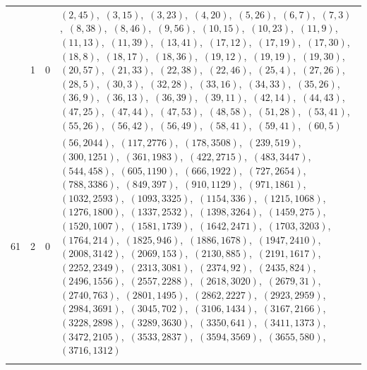\documentclass[11pt]{article}
\begin{document}
\begin{longtable}{@{}rrl>{\raggedright\arraybackslash}p{}@{}}
\addlinespace[3pt]
61 & 1 & $0$ & $(2,45)$,\allowbreak\ $(3,15)$,\allowbreak\ $(3,23)$,\allowbreak\ $(4,20)$,\allowbreak\ $(5,26)$,\allowbreak\ $(6,7)$,\allowbreak\ $(7,3)$,\allowbreak\ $(8,38)$,\allowbreak\ $(8,46)$,\allowbreak\ $(9,56)$,\allowbreak\ $(10,15)$,\allowbreak\ $(10,23)$,\allowbreak\ $(11,9)$,\allowbreak\ $(11,13)$,\allowbreak\ $(11,39)$,\allowbreak\ $(13,41)$,\allowbreak\ $(17,12)$,\allowbreak\ $(17,19)$,\allowbreak\ $(17,30)$,\allowbreak\ $(18,8)$,\allowbreak\ $(18,17)$,\allowbreak\ $(18,36)$,\allowbreak\ $(19,12)$,\allowbreak\ $(19,19)$,\allowbreak\ $(19,30)$,\allowbreak\ $(20,57)$,\allowbreak\ $(21,33)$,\allowbreak\ $(22,38)$,\allowbreak\ $(22,46)$,\allowbreak\ $(25,4)$,\allowbreak\ $(27,26)$,\allowbreak\ $(28,5)$,\allowbreak\ $(30,3)$,\allowbreak\ $(32,28)$,\allowbreak\ $(33,16)$,\allowbreak\ $(34,33)$,\allowbreak\ $(35,26)$,\allowbreak\ $(36,9)$,\allowbreak\ $(36,13)$,\allowbreak\ $(36,39)$,\allowbreak\ $(39,11)$,\allowbreak\ $(42,14)$,\allowbreak\ $(44,43)$,\allowbreak\ $(47,25)$,\allowbreak\ $(47,44)$,\allowbreak\ $(47,53)$,\allowbreak\ $(48,58)$,\allowbreak\ $(51,28)$,\allowbreak\ $(53,41)$,\allowbreak\ $(55,26)$,\allowbreak\ $(56,42)$,\allowbreak\ $(56,49)$,\allowbreak\ $(58,41)$,\allowbreak\ $(59,41)$,\allowbreak\ $(60,5)$\\
61 & 2 & $0$ & $(56,2044)$,\allowbreak\ $(117,2776)$,\allowbreak\ $(178,3508)$,\allowbreak\ $(239,519)$,\allowbreak\ $(300,1251)$,\allowbreak\ $(361,1983)$,\allowbreak\ $(422,2715)$,\allowbreak\ $(483,3447)$,\allowbreak\ $(544,458)$,\allowbreak\ $(605,1190)$,\allowbreak\ $(666,1922)$,\allowbreak\ $(727,2654)$,\allowbreak\ $(788,3386)$,\allowbreak\ $(849,397)$,\allowbreak\ $(910,1129)$,\allowbreak\ $(971,1861)$,\allowbreak\ $(1032,2593)$,\allowbreak\ $(1093,3325)$,\allowbreak\ $(1154,336)$,\allowbreak\ $(1215,1068)$,\allowbreak\ $(1276,1800)$,\allowbreak\ $(1337,2532)$,\allowbreak\ $(1398,3264)$,\allowbreak\ $(1459,275)$,\allowbreak\ $(1520,1007)$,\allowbreak\ $(1581,1739)$,\allowbreak\ $(1642,2471)$,\allowbreak\ $(1703,3203)$,\allowbreak\ $(1764,214)$,\allowbreak\ $(1825,946)$,\allowbreak\ $(1886,1678)$,\allowbreak\ $(1947,2410)$,\allowbreak\ $(2008,3142)$,\allowbreak\ $(2069,153)$,\allowbreak\ $(2130,885)$,\allowbreak\ $(2191,1617)$,\allowbreak\ $(2252,2349)$,\allowbreak\ $(2313,3081)$,\allowbreak\ $(2374,92)$,\allowbreak\ $(2435,824)$,\allowbreak\ $(2496,1556)$,\allowbreak\ $(2557,2288)$,\allowbreak\ $(2618,3020)$,\allowbreak\ $(2679,31)$,\allowbreak\ $(2740,763)$,\allowbreak\ $(2801,1495)$,\allowbreak\ $(2862,2227)$,\allowbreak\ $(2923,2959)$,\allowbreak\ $(2984,3691)$,\allowbreak\ $(3045,702)$,\allowbreak\ $(3106,1434)$,\allowbreak\ $(3167,2166)$,\allowbreak\ $(3228,2898)$,\allowbreak\ $(3289,3630)$,\allowbreak\ $(3350,641)$,\allowbreak\ $(3411,1373)$,\allowbreak\ $(3472,2105)$,\allowbreak\ $(3533,2837)$,\allowbreak\ $(3594,3569)$,\allowbreak\ $(3655,580)$,\allowbreak\ $(3716,1312)$\\
\addlinespace[3pt]
\end{longtable}
\endgroup
\end{document}

